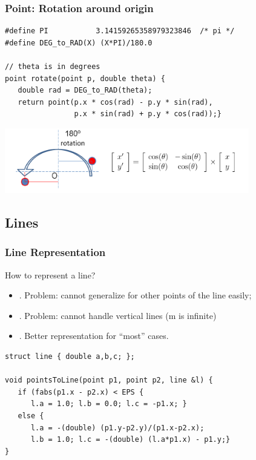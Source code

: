 \documentclass{beamer}
\begin{document}
\begin{frame}
  \frametitle{Point: Rotation around origin}
  {\smaller
    \begin{exampleblock}{}
\begin{verbatim}
#define PI           3.14159265358979323846  /* pi */
#define DEG_to_RAD(X) (X*PI)/180.0

// theta is in degrees
point rotate(point p, double theta) {
   double rad = DEG_to_RAD(theta);
   return point(p.x * cos(rad) - p.y * sin(rad),
                p.x * sin(rad) + p.y * cos(rad));}   
\end{verbatim}
    \end{exampleblock}
    \begin{center}
      \includegraphics[width=0.8\textwidth]{../img/rotation_halim}
    \end{center}
  }
\end{frame}

\subsection{Lines}

\begin{frame}
  \frametitle{Line Representation}

  {\small
  How to represent a line?

  \begin{itemize}
  \item {}. Problem: cannot generalize for other
    points of the line easily;
  \item {}. Problem: cannot handle vertical lines (m is infinite)
  \item {}. Better representation for ``most'' cases.
  \end{itemize}

  \begin{exampleblock}{}
\begin{verbatim}
struct line { double a,b,c; };

void pointsToLine(point p1, point p2, line &l) {
   if (fabs(p1.x - p2.x) < EPS { 
      l.a = 1.0; l.b = 0.0; l.c = -p1.x; }
   else {
      l.a = -(double) (p1.y-p2.y)/(p1.x-p2.x);
      l.b = 1.0; l.c = -(double) (l.a*p1.x) - p1.y;}
}
\end{verbatim}
  \end{exampleblock}
  }
\end{frame}
\end{document}
